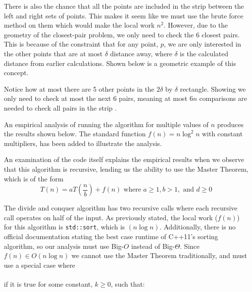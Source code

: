 \documentclass[11pt]{article}
\begin{document}
There is also the chance that all the points are included in the strip between the left and right sets of points. This makes it seem like we must use the brute force method on them which would make the local work $n^2$. However, due to the geometry of the closest-pair problem, we only need to check the 6 closest pairs. This is because of the constraint that for any point, $p$, we are only interested in the other points that are at most $\delta$ distance away, where $\delta$ is the calculated distance from earlier calculations. Shown below is a geometric example of this concept.
\begin{center}
\end{center}
Notice how at most there are 5 other points in the $2\delta$ by $\delta$ rectangle. Showing we only need to check at most the next 6 pairs, meaning at most $6n$ comparisons are needed to check all pairs in the strip \cite{levit}.

\clearpage
An empirical analysis of running the algorithm for multiple values of
$n$ produces the results shown below. The standard function $f(n) = n\log^2 n$ with constant multipliers, has been added to
illustrate the analysis.

\begin{center}
    
\end{center}

An examination of the code itself explains the empirical results when we observe that this algorithm is recursive, lending us the ability to use the Master Theorem, which is of the form
\[
	T(n)=aT(\frac{n}{b}) + f(n) \text{ where } a \geq 1, b > 1, \text{ and } d \geq 0
\]
	
The divide and conquer algorithm has two recursive calls where each recursive call operates on half of the input. As previously stated, the local work ($f(n)$) for this algorithm is \texttt{std::sort}, which is $( n\log n )$. Additionally, there is no official documentation stating the best case runtime of C++11's sorting algorithm, so our analysis must use Big-$O$ instead of Big-$\Theta$. Since $f(n)\in O(n\log n)$ we cannot use the Master Theorem traditionally, and must use a special case where \\ \\
	if it is true for some constant, $k\geq 0$, such that:
\end{document}

